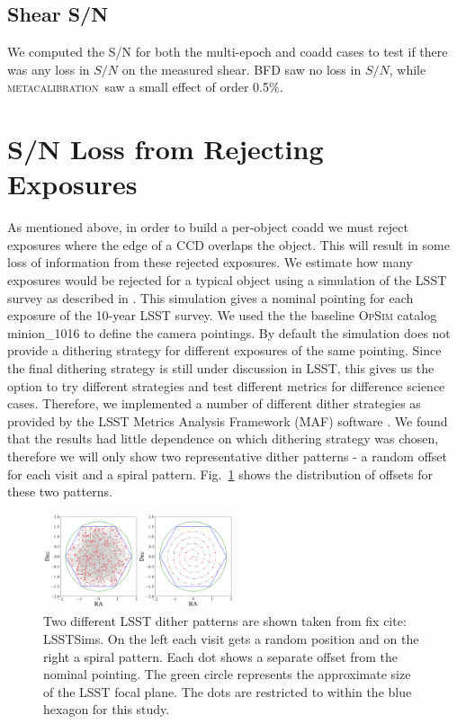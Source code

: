 \documentclass[fleqn,useAMS,usenatbib]{mnras}
\newcommand{\mcal}{\textsc{metacalibration}}
\begin{document}
\subsection{Shear S/N}
We computed the S/N for both the multi-epoch and coadd cases to test if there 
was any loss in $S/N$ on the measured shear.  BFD saw no loss in $S/N$, while 
\mcal\ saw a small effect of order 0.5$\%$.

\section{S/N Loss from Rejecting Exposures}
\label{Section:Exclusion}
As mentioned above, in order to build a per-object coadd we must reject 
exposures where the edge of a CCD overlaps the object.  This will result in 
some loss of information from these rejected exposures.  We estimate how many 
exposures would be rejected for a typical object using a simulation of the LSST 
survey as described in \cite{LSSTSims}.  This simulation gives a nominal 
pointing for each exposure of the 10-year LSST survey.  We used the the 
baseline \textsc{OpSim} catalog \textsf{minion\_1016} to define the camera 
pointings.  By default the simulation does not provide a dithering strategy for 
different exposures of the same pointing.  Since the final dithering strategy 
is still under discussion in LSST, this gives us the option to try different 
strategies and test different metrics for difference science cases.  Therefore, 
we implemented a number of different dither strategies as provided by the LSST 
Metrics Analysis Framework (MAF) software \citep{LSSTSims}.  We found that the 
results had little dependence on which dithering strategy was chosen, therefore 
we will only show two representative dither patterns - a random offset for each 
visit and a spiral pattern. Fig.~\ref{fig:dither} shows the distribution of 
offsets for these two patterns.

\begin{figure}
\includegraphics[width=0.5\textwidth]{Dither.png}
\caption{
Two different LSST dither patterns are shown taken from fix cite: LSSTSims.  
On the left each visit gets a random position and on the right a spiral pattern.
Each dot shows a separate offset from the nominal pointing.
The green circle represents the approximate size of the LSST focal plane.  
The dots are restricted to within the blue hexagon for this study. 
}
\label{fig:dither}
\end{figure}
\end{document}
